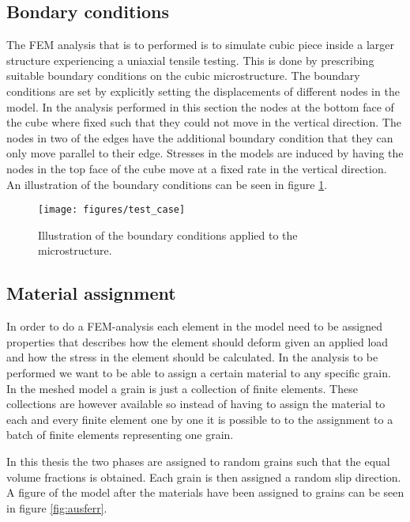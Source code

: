 \documentclass[crystal_plast.tex]{subfiles}
\begin{document}
\subsection{Bondary conditions}
The FEM analysis that is to performed is to simulate cubic piece inside a larger structure experiencing a uniaxial tensile testing. This is done by prescribing suitable boundary conditions on the cubic microstructure. The boundary conditions are set by explicitly setting the displacements of different nodes in the model. In the analysis performed in this section the nodes at the bottom face of the cube where fixed such that they could not move in the vertical direction. The nodes in two of the edges have the additional boundary condition that they can only move parallel to their edge. Stresses in the models are induced by having the nodes in the top face of the cube move at a fixed rate in the vertical direction. An illustration of the boundary conditions can be seen in figure \ref{fig:test_case}. 


\begin{figure}[ht]
\centering
\texttt{[image: figures/test\_case]}
\caption{Illustration of the boundary conditions applied to the microstructure.}
\label{fig:test_case}
\end{figure}

\subsection{Material assignment}

In order to do a FEM-analysis each element in the model need to be assigned properties that describes how the element should deform given an applied load and how the stress in the element should be calculated. In the analysis to be performed we want to be able to assign a certain material to any specific grain. In the meshed model a grain is just a collection of finite elements. These collections are however available so instead of having to assign the material to each and every finite element one by one it is possible to to the assignment to a batch of finite elements representing one grain.

In this thesis the two phases are assigned to random grains such that the equal volume fractions is obtained. Each grain is then assigned a random slip direction. A figure of the model after the materials have been assigned to grains can be seen in figure \ref{fig:ausferr}. 
\end{document}
